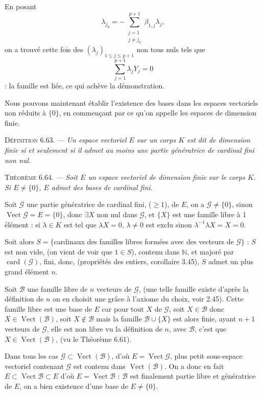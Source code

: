 En posant
\[
\lambda_{j_0}=-\sum_{\substack{j=1\\j\ne j_0}}^{p+1}\beta_{1,j}\lambda_j,
\]
on a trouvé cette fois des $(\lambda_j)_{1\le j\le p+1}$ non tous nuls tels que
\[
\sum_{j=1}^{p+1}\lambda_jY_j=0
\]
: la famille est liée, ce qui achève la démonstration. \bookend

Nous pouvons maintenant établir l'existence des bases dans les espaces vectoriels non réduits à $\{0\}$, en commençant par ce qu'on appelle les espaces de dimension finie.

\medskip\noindent\textsc{Définition 6.63.} --- \emph{Un espace vectoriel $E$ sur un corps $K$ est dit de dimension finie si et seulement si il admet au moins une partie génératrice de cardinal fini non nul.}

\medskip\noindent\textsc{Théorème 6.64.} --- \emph{Soit $E$ un espace vectoriel de dimension finie sur le corps $K$. Si $E\ne\{0\}$, $E$ admet des bases de cardinal fini.}

Soit $\mathcal G$ une partie génératrice de cardinal fini, ($\ge1$), de $E$, on a $\mathcal G\ne\{0\}$, sinon $\operatorname{Vect}\mathcal G=E=\{0\}$, donc $\exists X$ non nul dans $\mathcal G$, et $\{X\}$ est une famille libre à 1 élément : si $\lambda\in K$ est tel que $\lambda X=0$, $\lambda\ne0$ est exclu sinon $\lambda^{-1}\lambda X=X=0$.

Soit alors $S=\{$cardinaux des familles libres formées avec des vecteurs de $\mathcal G\}$ : $S$ est non vide, (on vient de voir que $1\in S$), contenu dans $\mathbb N$, et majoré par $\operatorname{card}(\mathcal G)$, fini, donc, (propriétés des entiers, corollaire 3.45), $S$ admet un plus grand élément $n$.

Soit $\mathcal B$ une famille libre de $n$ vecteurs de $\mathcal G$, (une telle famille existe d'après la définition de $n$ on en choisit une grâce à l'axiome du choix, voir 2.45). Cette famille libre est une base de $E$ car pour tout $X$ de $\mathcal G$, soit $X\in\mathcal B$ donc $X\in\operatorname{Vect}(\mathcal B)$, soit $X\notin\mathcal B$ mais la famille $\mathcal B\cup\{X\}$ est alors finie, ayant $n+1$ vecteurs de $\mathcal G$, elle est non libre vu la définition de $n$, avec $\mathcal B$, c'est que $X\in\operatorname{Vect}(\mathcal B)$, (vu le Théorème 6.61).

Dans tous les cas $\mathcal G\subset\operatorname{Vect}(\mathcal B)$, d'où $E=\operatorname{Vect}\mathcal G$, plus petit sous-espace vectoriel contenant $\mathcal G$ est contenu dans $\operatorname{Vect}(\mathcal B)$. On a donc en fait $E\subset\operatorname{Vect}\mathcal B\subset E$ d'où $E=\operatorname{Vect}\mathcal B$ : $\mathcal B$ est finalement partie libre et génératrice de $E$, on a bien existence d'une base de $E\ne\{0\}$. \bookend


